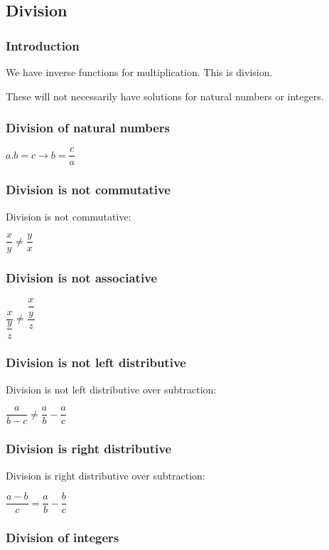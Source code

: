 
\subsection{Division}

\subsubsection{Introduction}

We have inverse functions for multiplication. This is division.

These will not necessarily have solutions for natural numbers or integers. 

\subsubsection{Division of natural numbers}

\(a.b=c\rightarrow b=\dfrac{c}{a}\)
	
\subsubsection{Division is not commutative}

Division is not commutative:

\(\dfrac{x}{y}\ne \dfrac{y}{x}\)

\subsubsection{Division is not associative}

\(\dfrac{x}{\dfrac{y}{z}}\ne \dfrac{\dfrac{x}{y}}{z}\)

\subsubsection{Division is not left distributive}

Division is not left distributive over subtraction:

\(\dfrac{a}{b-c} \ne \dfrac{a}{b} -\dfrac{a}{c}\)

\subsubsection{Division is right distributive}

Division is right distributive over subtraction:

\(\dfrac{a-b}{c} =\dfrac{a}{b} -\dfrac{b}{c}\)
	


\subsubsection{Division of integers}


